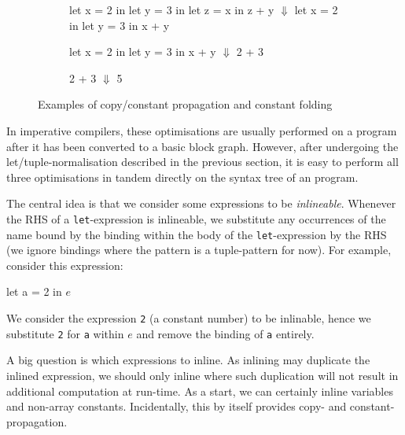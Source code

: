 \begin{figure}
\begin{subfigure}[t]{.33\textwidth}
\centering
\begin{colorcode}
let x = 2 in
let y = 3 in
let z = x in
z + y
  \(\Downarrow\)
let x = 2 in
let y = 3 in
x + y
\end{colorcode}
\end{subfigure}%
\begin{subfigure}[t]{.33\textwidth}
\centering
\begin{colorcode}
let x = 2 in
let y = 3 in
x + y
  \(\Downarrow\)
2 + 3
\end{colorcode}
\vspace{2.9\baselineskip}
\end{subfigure}%
\begin{subfigure}[t]{.33\textwidth}
\centering
\begin{colorcode}
2 + 3
  \(\Downarrow\)
5
\end{colorcode}
\vspace{4.7\baselineskip}
\end{subfigure}
\caption{Examples of copy/constant propagation and constant folding}
\label{fig:copy/constant-propagation/folding}
\end{figure}

In imperative compilers, these optimisations are usually performed on
a program after it has been converted to a basic block graph.
However, after undergoing the let/tuple-normalisation described in the
previous section, it is easy to perform all three optimisations in
tandem directly on the syntax tree of an \LO{} program.

The central idea is that we consider some expressions to be
\textit{inlineable}.  Whenever the RHS of a \texttt{let}-expression is
inlineable, we substitute any occurrences of the name bound by the
binding within the body of the \texttt{let}-expression by the RHS (we
ignore bindings where the pattern is a tuple-pattern for now).  For
example, consider this expression:
\begin{colorcode}
let a = 2 in
\(e\)
\end{colorcode}
We consider the expression \texttt{2} (a constant number) to be
inlinable, hence we substitute \texttt{2} for \texttt{a} within $e$
and remove the binding of \texttt{a} entirely.

A big question is which expressions to inline.  As inlining may
duplicate the inlined expression, we should only inline where such
duplication will not result in additional computation at run-time.  As
a start, we can certainly inline variables and non-array constants.
Incidentally, this by itself provides copy- and constant-propagation.


